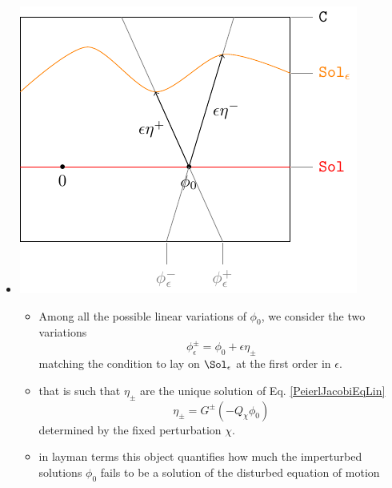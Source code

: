 \documentclass[a4paper,11pt]{scrartcl}
\begin{document}
\begin{itemize}
\item 
        \begin{minipage}{0.4\textwidth}
            \includegraphics[width=\textwidth]{../Pictures/GeometricPicture2}
        \end{minipage}
        \begin{minipage}{0.5\textwidth}
            \begin{itemize}
                \item    Among all the possible linear variations of $\phi_0$, we consider the two variations $$\phi_\epsilon^\pm = \phi_0 + \epsilon \eta_\pm$$ matching the condition to lay on $\Sol_\epsilon$ at the first order in $\epsilon$.
                \item that is such that $\eta_\pm$ are the unique solution of Eq. \ref{PeierlJacobiEqLin}
                    $$ \eta_\pm = G^\pm \left( - Q_\chi \phi_0 \right) $$
                    determined by the fixed perturbation $\chi$.
                \item in layman terms this object quantifies how much the imperturbed solutions $\phi_0$ fails to be a solution of the disturbed equation of motion
            \end{itemize}
        \end{minipage}


\end{itemize}
\end{document}
